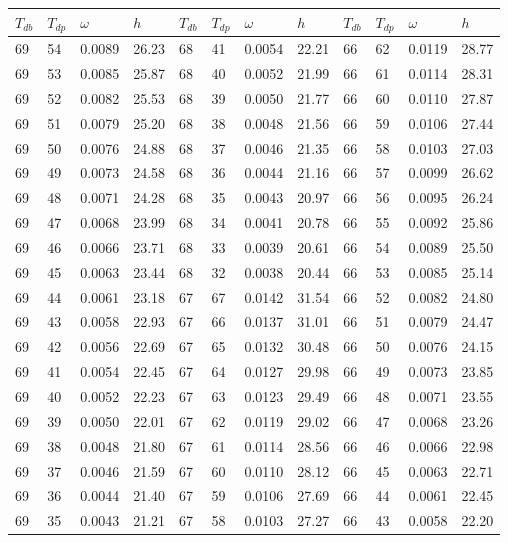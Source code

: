 \begin{tabular}{llll|llll|llll}
 \toprule 
\(T_{db}\) & \(T_{dp}\) & \(\omega\) & \(h\) & \(T_{db}\) & \(T_{dp}\) & \(\omega\) & \(h\) & \(T_{db}\) & \(T_{dp}\) & \(\omega\) & \(h\)  \\ \midrule 
69 & 54 & 0.0089 & 26.23 & 68 & 41 & 0.0054 & 22.21 & 66 & 62 & 0.0119 & 28.77\\
69 & 53 & 0.0085 & 25.87 & 68 & 40 & 0.0052 & 21.99 & 66 & 61 & 0.0114 & 28.31\\
69 & 52 & 0.0082 & 25.53 & 68 & 39 & 0.0050 & 21.77 & 66 & 60 & 0.0110 & 27.87\\
69 & 51 & 0.0079 & 25.20 & 68 & 38 & 0.0048 & 21.56 & 66 & 59 & 0.0106 & 27.44\\
69 & 50 & 0.0076 & 24.88 & 68 & 37 & 0.0046 & 21.35 & 66 & 58 & 0.0103 & 27.03\\
69 & 49 & 0.0073 & 24.58 & 68 & 36 & 0.0044 & 21.16 & 66 & 57 & 0.0099 & 26.62\\
69 & 48 & 0.0071 & 24.28 & 68 & 35 & 0.0043 & 20.97 & 66 & 56 & 0.0095 & 26.24\\
69 & 47 & 0.0068 & 23.99 & 68 & 34 & 0.0041 & 20.78 & 66 & 55 & 0.0092 & 25.86\\
69 & 46 & 0.0066 & 23.71 & 68 & 33 & 0.0039 & 20.61 & 66 & 54 & 0.0089 & 25.50\\
69 & 45 & 0.0063 & 23.44 & 68 & 32 & 0.0038 & 20.44 & 66 & 53 & 0.0085 & 25.14\\
69 & 44 & 0.0061 & 23.18 & 67 & 67 & 0.0142 & 31.54 & 66 & 52 & 0.0082 & 24.80\\
69 & 43 & 0.0058 & 22.93 & 67 & 66 & 0.0137 & 31.01 & 66 & 51 & 0.0079 & 24.47\\
69 & 42 & 0.0056 & 22.69 & 67 & 65 & 0.0132 & 30.48 & 66 & 50 & 0.0076 & 24.15\\
69 & 41 & 0.0054 & 22.45 & 67 & 64 & 0.0127 & 29.98 & 66 & 49 & 0.0073 & 23.85\\
69 & 40 & 0.0052 & 22.23 & 67 & 63 & 0.0123 & 29.49 & 66 & 48 & 0.0071 & 23.55\\
69 & 39 & 0.0050 & 22.01 & 67 & 62 & 0.0119 & 29.02 & 66 & 47 & 0.0068 & 23.26\\
69 & 38 & 0.0048 & 21.80 & 67 & 61 & 0.0114 & 28.56 & 66 & 46 & 0.0066 & 22.98\\
69 & 37 & 0.0046 & 21.59 & 67 & 60 & 0.0110 & 28.12 & 66 & 45 & 0.0063 & 22.71\\
69 & 36 & 0.0044 & 21.40 & 67 & 59 & 0.0106 & 27.69 & 66 & 44 & 0.0061 & 22.45\\
69 & 35 & 0.0043 & 21.21 & 67 & 58 & 0.0103 & 27.27 & 66 & 43 & 0.0058 & 22.20\\

\end{tabular}

